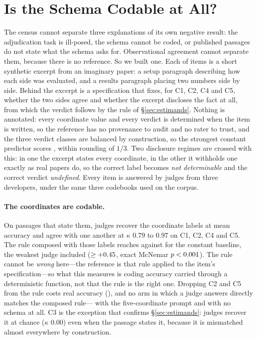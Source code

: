 \documentclass[11pt]{article}
\begin{document}
\section{Is the Schema Codable at All?}
\label{sec:instrument}

The census cannot separate three explanations of its own negative result: the
adjudication task is ill-posed, the schema cannot be coded, or published
passages do not state what the schema asks for. Observational agreement cannot
separate them, because there is no reference. So we built one. Each of
\InsItems{} items is a short synthetic excerpt from an imaginary paper: a setup
paragraph describing how each side was evaluated, and a results paragraph
placing two numbers side by side. Behind the excerpt is a specification that
fixes, for C1, C2, C4 and C5, whether the two sides agree and whether the
excerpt discloses the fact at all, from which the verdict follows by the rule of
\S\ref{sec:estimands}. Nothing is annotated: every coordinate value and every
verdict is determined when the item is written, so the reference has no
provenance to audit and no rater to trust, and the three verdict classes are
balanced by construction, so the strongest constant predictor scores
\InsBaseline{}, within rounding of $1/3$. Two disclosure regimes are crossed
with this: in one the excerpt states every coordinate, in the other it withholds
one exactly as real papers do, so the correct label becomes \emph{not
determinable} and the correct verdict \emph{undefined}. Every item is answered
by \InsJudges{} judges from three developers, under the same three codebooks
used on the corpus.



\paragraph{The coordinates are codable.}
On passages that state them, judges recover the coordinate labels at
\InsCoordFull{} mean accuracy and agree with one another at $\kappa$ $0.79$ to
$0.97$ on C1, C2, C4 and C5. The rule composed with those labels reaches
\InsRule{} against \InsBaseline{} for the constant baseline, the weakest judge
included ($\geq+0.45{}$, exact McNemar $p<0.001$). The rule cannot be
\emph{wrong} here---the reference is that rule applied to the item's
specification---so what this measures is coding accuracy carried through a
deterministic function, not that the rule is the right one. Dropping C2 and C5 from the rule
costs real accuracy (\InsAblated{}), and no arm in which a judge answers
directly matches the composed rule---\InsJudgeFive{} with the five-coordinate
prompt and \InsJudgeDirect{} with no schema at all. C3 is the exception that
confirms \S\ref{sec:estimands}:
judges recover it at chance ($\kappa$ $0.00$) even when the passage states it,
because it is mismatched almost everywhere by construction.
\end{document}
